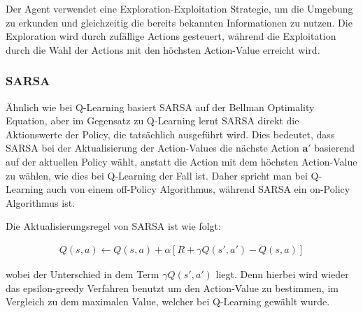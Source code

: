 Der Agent verwendet eine Exploration-Exploitation Strategie, um die Umgebung zu erkunden und gleichzeitig die bereits bekannten Informationen zu nutzen. Die Exploration wird durch zufällige Actions gesteuert, während die Exploitation durch die Wahl der Actions mit den höchsten Action-Value erreicht wird.



\subsubsection{SARSA}

Ähnlich wie bei Q-Learning basiert SARSA auf der Bellman Optimality Equation, aber im Gegensatz zu Q-Learning lernt SARSA direkt die Aktionswerte der Policy, die tatsächlich ausgeführt wird. Dies bedeutet, dass SARSA bei der Aktualisierung der Action-Values die nächste Action $\bm{a'}$ basierend auf der aktuellen Policy wählt, anstatt die Action mit dem höchsten Action-Value zu wählen, wie dies bei Q-Learning der Fall ist.
Daher spricht man bei Q-Learning auch von einem off-Policy Algorithmus, während SARSA ein on-Policy Algorithmus ist. 

Die Aktualisierungsregel von SARSA ist wie folgt:

\begin{align}
    Q(s,a) \leftarrow Q(s,a) + \alpha [R + \gamma Q(s',a') - Q(s,a)]
\end{align}

wobei der Unterschied in dem Term $\gamma Q(s',a')$ liegt. Denn hierbei wird wieder das epsilon-greedy Verfahren benutzt um den Action-Value zu bestimmen, im Vergleich zu dem maximalen Value, welcher bei Q-Learning gewählt wurde.

